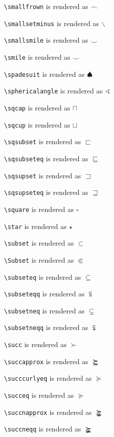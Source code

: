 \texttt{\textbackslash smallfrown} is rendered as $\smallfrown$


\texttt{\textbackslash smallsetminus} is rendered as $\smallsetminus$


\texttt{\textbackslash smallsmile} is rendered as $\smallsmile$


\texttt{\textbackslash smile} is rendered as $\smile$


\texttt{\textbackslash spadesuit} is rendered as $\spadesuit$


\texttt{\textbackslash sphericalangle} is rendered as $\sphericalangle$


\texttt{\textbackslash sqcap} is rendered as $\sqcap$


\texttt{\textbackslash sqcup} is rendered as $\sqcup$


\texttt{\textbackslash sqsubset} is rendered as $\sqsubset$


\texttt{\textbackslash sqsubseteq} is rendered as $\sqsubseteq$


\texttt{\textbackslash sqsupset} is rendered as $\sqsupset$


\texttt{\textbackslash sqsupseteq} is rendered as $\sqsupseteq$


\texttt{\textbackslash square} is rendered as $\square$


\texttt{\textbackslash star} is rendered as $\star$


\texttt{\textbackslash subset} is rendered as $\subset$


\texttt{\textbackslash Subset} is rendered as $\Subset$


\texttt{\textbackslash subseteq} is rendered as $\subseteq$


\texttt{\textbackslash subseteqq} is rendered as $\subseteqq$


\texttt{\textbackslash subsetneq} is rendered as $\subsetneq$


\texttt{\textbackslash subsetneqq} is rendered as $\subsetneqq$


\texttt{\textbackslash succ} is rendered as $\succ$


\texttt{\textbackslash succapprox} is rendered as $\succapprox$


\texttt{\textbackslash succcurlyeq} is rendered as $\succcurlyeq$


\texttt{\textbackslash succeq} is rendered as $\succeq$


\texttt{\textbackslash succnapprox} is rendered as $\succnapprox$


\texttt{\textbackslash succneqq} is rendered as $\succneqq$


